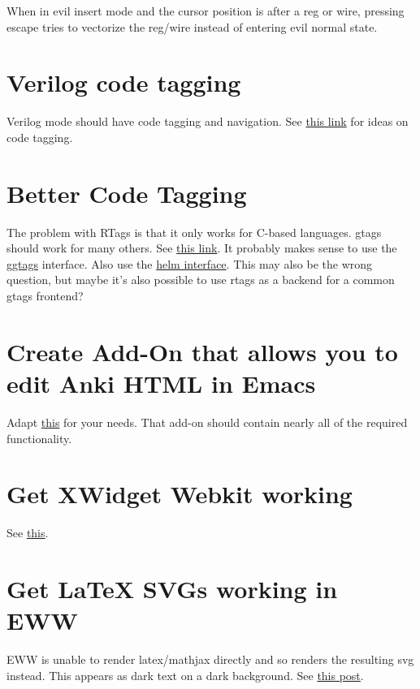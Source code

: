 \documentclass{default}
\begin{document}
When in evil insert mode and the cursor position is after a reg or wire, pressing escape tries to
vectorize the reg/wire instead of entering evil normal state.

\section{Verilog code tagging}

Verilog mode should have code tagging and navigation. See
\href{https://scripter.co/ctags-systemverilog-and-emacs/}{this link} for ideas on code tagging.

\section{Better Code Tagging}

The problem with RTags is that it only works for C-based languages. gtags should work for many
others. See \href{https://tuhdo.github.io/c-ide.html}{this link}. It probably makes sense to use the
\href{https://github.com/leoliu/ggtags}{ggtags} interface. Also use the
\href{https://github.com/syohex/emacs-helm-gtags/}{helm interface}. This may also be the wrong
question, but maybe it's also possible to use rtags as a backend for a common gtags frontend?

\section{Create Add-On that allows you to edit Anki HTML in Emacs}

Adapt \href{https://github.com/louietan/anki-editor}{this} for your needs. That add-on should
contain nearly all of the required functionality.

\section{Get XWidget Webkit working}

See \href{https://emacsnotes.wordpress.com/2018/08/18/why-a-minimal-browser-when-there-is-a-full-featured-one-introducingxwidget-webkit-a-state-of-the-art-browser-for-your-modern-emacs/}{this}.

\section{Get LaTeX SVGs working in EWW}

EWW is unable to render latex/mathjax directly and so renders the resulting svg instead. This
appears as dark text on a dark background. See
\href{https://emacs.stackexchange.com/questions/3622/use-a-different-color-theme-for-eww-buffers}{this
  post}.
\end{document}
